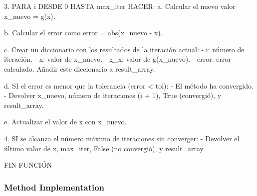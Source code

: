\documentclass{article}
\begin{document}
    3. PARA i DESDE 0 HASTA max_iter HACER:
        a. Calcular el nuevo valor x_nuevo = g(x).

        b. Calcular el error como error = abs(x_nuevo - x).

        c. Crear un diccionario con los resultados de la iteración actual:
           - i: número de iteración.
           - x: valor de x_nuevo.
           - g_x: valor de g(x_nuevo).
           - error: error calculado.
           Añadir este diccionario a result_array.

        d. SI el error es menor que la tolerancia (error < tol):
            - El método ha convergido.
            - Devolver x_nuevo, número de iteraciones (i + 1), True (convergió), y result_array.

        e. Actualizar el valor de x con x_nuevo.

    4. SI se alcanza el número máximo de iteraciones sin converger:
        - Devolver el último valor de x, max_iter, False (no convergió), y result_array.

FIN FUNCIÓN

    \subsubsection{Method Implementation}
\end{document}
